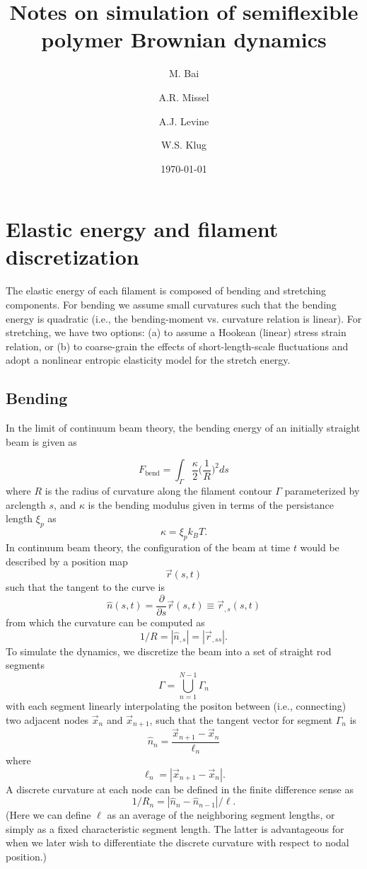 \documentclass[pre,floatfix,twocolumn]{revtex4}
\begin{document}
\author{M. Bai}
\author{A.R. Missel}
\author{A.J. Levine}
\author{W.S. Klug}


\title{Notes on simulation of semiflexible polymer Brownian dynamics}


\date{\today}

\maketitle

\section{Elastic energy and filament discretization}

The elastic energy of each filament is composed of bending and stretching components.  For bending we assume small curvatures such that the bending energy is quadratic (i.e., the bending-moment vs. curvature relation is linear).  For stretching, we have two options: (a) to assume a Hookean (linear) stress strain relation, or (b) to coarse-grain the effects of short-length-scale fluctuations and adopt a nonlinear entropic elasticity model for the stretch energy.

\subsection{Bending}

In the limit of continuum beam theory, the bending energy of an initially straight beam is given as

\[
F_\text{bend} = \int_\Gamma \frac{\kappa}{2} \Big(\frac{1}{R}\Big)^2 ds
\]
where $R$ is the radius of curvature along the filament contour $\Gamma$ parameterized by arclength $s$, and $\kappa$ is the bending modulus given in terms of the persistance length $\xi_p$ as
\[
\kappa = \xi_p k_B T .
\]
In continuum beam theory, the configuration of the beam at time $t$ would be described by a position map
\[
\vec{r}(s,t)
\]
such that the tangent to the curve is 
\[
\hat{n}(s,t) = \frac{\partial}{\partial s} \vec{r}(s,t) \equiv \vec{r}_{,s}(s,t) 
\]
from which the curvature can be computed as 
\[
1/R = |\hat{n}_{,s}| = |\vec{r}_{,ss}| .
\]
To simulate the dynamics, we discretize the beam into a set of straight rod segments 
\[
\Gamma = \bigcup_{n=1}^{N-1} \Gamma_n
\]
with each segment linearly interpolating the positon between (i.e., connecting) two adjacent nodes $\vec{x}_n$ and $\vec{x}_{n+1}$, such that the tangent vector for segment $\Gamma_n$ is
\[
\hat{n}_n = \frac{\vec{x}_{n+1} - \vec{x}_n}{\ell_n} 
\]
where
\[
\ell_n = |{\vec{x}_{n+1} - \vec{x}_n}| .
\]
A discrete curvature at each node can be defined in the finite difference sense as
\[
1/R_n = |\hat{n}_n-\hat{n}_{n-1}|/\ell .
\]
(Here we can define $\ell$ as an average of the neighboring segment lengths, or simply as a fixed characteristic segment length.  The latter is advantageous for when we later wish to differentiate the discrete curvature with respect to nodal position.)
\end{document}
